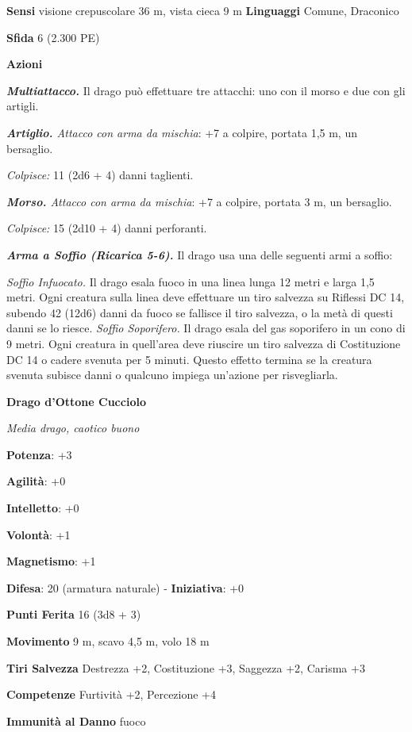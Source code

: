 \begin{multicols}{2}
\textbf{Sensi} visione crepuscolare 36 m, vista cieca 9 m
\textbf{Linguaggi} Comune, Draconico

\textbf{Sfida} 6 (2.300 PE)

\textbf{Azioni}

\emph{\textbf{Multiattacco.}} Il drago può effettuare tre attacchi: uno
con il morso e due con gli artigli.

\emph{\textbf{Artiglio.} Attacco con arma da mischia}: +7 a colpire,
portata 1,5 m, un bersaglio.

\emph{Colpisce:} 11 (2d6 + 4) danni taglienti.

\emph{\textbf{Morso.} Attacco con arma da mischia}: +7 a colpire,
portata 3 m, un bersaglio.

\emph{Colpisce:} 15 (2d10 + 4) danni perforanti.

\emph{\textbf{Arma a Soffio (Ricarica 5-6).}} Il drago usa una delle
seguenti armi a soffio:

\emph{Soffio Infuocato.} Il drago esala fuoco in una linea lunga 12
metri e larga 1,5 metri. Ogni creatura sulla linea deve effettuare un
tiro salvezza su Riflessi DC 14, subendo 42 (12d6) danni da fuoco se
fallisce il tiro salvezza, o la metà di questi danni se lo riesce.
\emph{Soffio Soporifero.} Il drago esala del gas soporifero in un cono
di 9 metri. Ogni creatura in quell'area deve riuscire un tiro salvezza
di Costituzione DC 14 o cadere svenuta per 5 minuti. Questo effetto
termina se la creatura svenuta subisce danni o qualcuno impiega
un'azione per risvegliarla.

\textbf{Drago d'Ottone Cucciolo}

\emph{Media drago, caotico buono}

\textbf{Potenza}: +3

\textbf{Agilità}: +0

\textbf{Intelletto}: +0

\textbf{Volontà}: +1

\textbf{Magnetismo}: +1

\textbf{Difesa}: 20 (armatura naturale) - \textbf{Iniziativa}: +0

\textbf{Punti Ferita} 16 (3d8 + 3)

\textbf{Movimento} 9 m, scavo 4,5 m, volo 18 m

\textbf{Tiri Salvezza} Destrezza +2, Costituzione +3, Saggezza +2,
Carisma +3

\textbf{Competenze} Furtività +2, Percezione +4

\textbf{Immunità al Danno} fuoco


\end{multicols}
